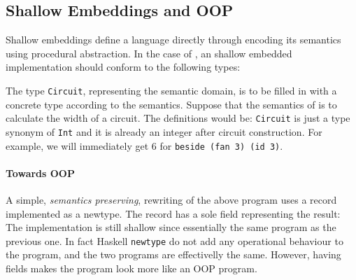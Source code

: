 \subsection{Shallow Embeddings and OOP}
Shallow embeddings define a language directly through encoding its semantics
using procedural abstraction. In the case of \dsl,
an shallow embedded implementation should conform to the following
types:

The type \lstinline{Circuit}, representing the semantic domain, is to be filled in with a concrete type according to the semantics.
Suppose that the semantics of \dsl is to calculate the width of a
circuit. The definitions would be:
\lstinline{Circuit} is just a type
synonym of \lstinline{Int} and it is already an integer after circuit construction.
For example, we will immediately get $6$ for \lstinline{beside (fan 3) (id 3)}.

\begin{comment}

A simple rewriting of the previous program is to wrap the result into an
datatype, getting back the value through pattern matching:

\end{comment}

\paragraph{Towards OOP}
A simple, \emph{semantics preserving}, rewriting of the above program 
uses a record implemented as a newtype. The record has a sole field representing the result:
The implementation is still shallow since essentially the same program
as the previous one. In fact Haskell \lstinline{newtype} do not add any operational
behaviour to the program, and the two programs are effectivelly the
same.  However, having fields makes the program look more like an 
OOP program.

